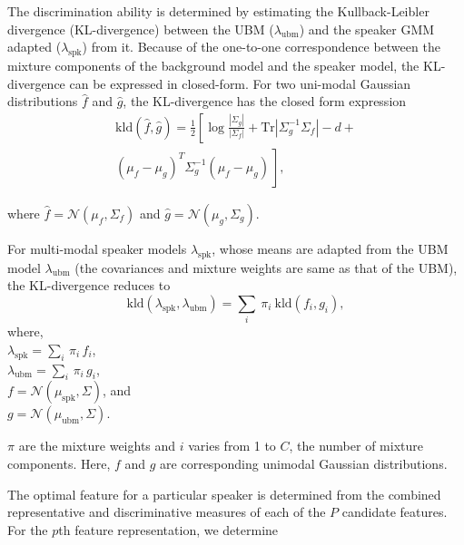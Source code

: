 \documentclass{article}
\begin{document}
The discrimination ability is determined by estimating the Kullback-Leibler divergence
(KL-divergence) between the UBM ($\lambda_{\textrm{ubm}}$) and the speaker GMM adapted 
($\lambda_{\textrm{spk}}$) from it. Because of the one-to-one
correspondence between the mixture components of the background model and the speaker model, 
the KL-divergence can be expressed in closed-form. For two uni-modal Gaussian distributions
$\hat{f}$ and $\hat{g}$, the KL-divergence has the closed form expression
\begin{equation}
\begin{split}
\textrm{kld}(\hat{f},\hat{g}) = \frac{1}{2}\left[ \log \frac{|\Sigma_g|}{|\Sigma_f|} +
	\textrm{Tr}|\Sigma^{-1}_g\Sigma_f| - d + \right. \\ 
\left. (\mu_f-\mu_g)^T\Sigma_g^{-1}(\mu_f-\mu_g) \frac{}{} \right], 
\end{split}
\label{eq:kldGaussians}
\end{equation}

where $\hat{f} = \mathcal{N}(\mu_f,\Sigma_f)$ and $\hat{g} = \mathcal{N}(\mu_g,\Sigma_g)$.

For multi-modal speaker models $\lambda_{\textrm{spk}}$, whose means are adapted from the UBM model
$\lambda_{\textrm{ubm}}$ (the covariances and mixture weights are same as that of the UBM), 
the KL-divergence reduces to 
\begin{equation}
\textrm{kld}(\lambda_{\textrm{spk}},\lambda_{\textrm{ubm}}) = 
	\displaystyle \sum_i\ \pi_i\ \textrm{kld}(f_i,g_i),
\label{eq:gmmAdaptedKLD}
\end{equation}
where, \\
$\lambda_{\textrm{spk}} = \displaystyle \sum_i \, \pi_i \, f_i$, \\
$\lambda_{\textrm{ubm}} = \displaystyle\sum_i \, \pi_i \, g_i$, \\
$f = \mathcal{N}(\mu_{\textrm{spk}},\Sigma)$, and \\
$g = \mathcal{N}(\mu_{\textrm{ubm}},\Sigma)$.

$\pi$ are the mixture weights and
$i$ varies from 1 to $C$, the number of mixture components. Here, $f$ and $g$ are
corresponding unimodal Gaussian distributions.


The optimal feature for a particular speaker is determined from the combined
representative and discriminative measures of each of the $P$ candidate
features. For the $p$th feature representation, we determine
\end{document}
